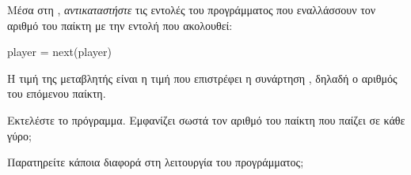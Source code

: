 \documentclass[a4paper,11pt,oneside]{book}
\begin{document}
\begin{step} 
Μέσα στη , \emph{αντικαταστήστε} τις εντολές του προγράμματος που εναλλάσσουν τον αριθμό του παίκτη με την εντολή που ακολουθεί:

\begin{pynew}
    player = next(player)
\end{pynew}

Η τιμή της μεταβλητής  είναι η τιμή που επιστρέφει η συνάρτηση , δηλαδή ο αριθμός του επόμενου παίκτη.

Εκτελέστε το πρόγραμμα. Εμφανίζει σωστά τον αριθμό του παίκτη που παίζει σε κάθε γύρο; 

\marginnote[14pt]{\icondiscuss}
\dottedline

Παρατηρείτε κάποια διαφορά στη λειτουργία του προγράμματος;

\marginnote[14pt]{\icondiscuss}
\dottedline
\end{step}
\end{document}
